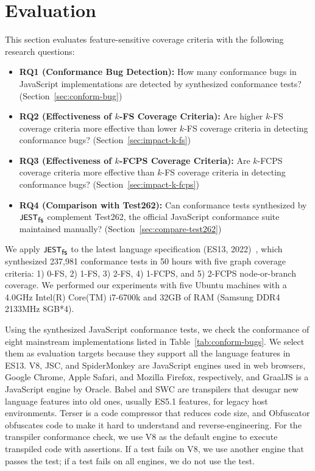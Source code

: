 \section{Evaluation}\label{sec:eval}
This section evaluates feature-sensitive coverage criteria with the following research questions:
\begin{itemize}
  \item \textbf{RQ1 (Conformance Bug Detection):} How many conformance bugs
 in JavaScript implementations are detected by synthesized conformance tests?
    (Section~\ref{sec:conform-bug})
  \item \textbf{RQ2 (Effectiveness of $k$-FS Coverage Criteria):} Are higher $k$-FS
    coverage criteria more effective than lower $k$-FS coverage
    criteria in detecting conformance bugs? (Section~\ref{sec:impact-k-fs})
  \item \textbf{RQ3 (Effectiveness of $k$-FCPS Coverage Criteria):} Are $k$-FCPS
    coverage criteria more effective than $k$-FS coverage criteria in detecting
    conformance bugs? (Section~\ref{sec:impact-k-fcps})
  \item \textbf{RQ4 (Comparison with Test262):} Can conformance tests
    synthesized by $\textsf{\small JEST}_{\textsf{\small fs}}$ complement Test262, the official JavaScript conformance
    suite maintained manually? (Section~\ref{sec:compare-test262})
\end{itemize}

We apply $\textsf{\small JEST}_{\textsf{\small fs}}$ to the latest language specification (ES13, 2022)~\cite{es13},
which synthesized 237,981 conformance tests in 50 hours with
five graph coverage criteria: 1) 0-FS, 2) 1-FS, 3) 2-FS, 4) 1-FCPS,
and 5) 2-FCPS node-or-branch coverage.
We performed our experiments with five Ubuntu machines with a 4.0GHz Intel(R)
Core(TM) i7-6700k and 32GB of RAM (Samsung DDR4 2133MHz 8GB*4).


Using the synthesized JavaScript conformance tests, we check the conformance of
eight mainstream implementations listed in Table~\ref{tab:conform-bugs}.
We select them as evaluation targets because they support all the language
features in ES13.
V8, JSC, and SpiderMonkey are JavaScript engines used in web browsers, Google
Chrome, Apple Safari, and Mozilla Firefox, respectively, and
GraalJS is a JavaScript engine by Oracle.
Babel and SWC are transpilers that desugar new language features into old ones,
usually ES5.1 features, for legacy host environments.
Terser is a code compressor that reduces code size, and
Obfuscator obfuscates code to make it hard to understand and reverse-engineering.
For the transpiler conformance check, we use V8 as the default engine
to execute transpiled code with assertions.
If a test fails on V8, we use another engine that passes the test;
if a test fails on all engines, we do not use the test.

